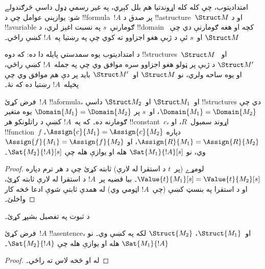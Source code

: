 \documentclass[../../../include/open-logic-section]{subfiles}
\begin{document}


\begin{explain}
امتداديتوب، چې کله کله اړوندتيا هم بلل کېږي، په غير رسمي ډول داسې
څرګندولے شو: يوازېني عوامل چې د !!{formula}~$!A$ پر صدق د
!!a{structure}~$\Struct M$ او د !!a{variable} ګومارنې~$s$ په نسبت
اغېز لري، د !!{domain} کچه او هغه ګومارنې دي چې~$\Struct M$ او~$s$ ئې
د ژبې هغو اجزاوو ته کوي چې په رښتيا په~$!A$ کښې راځي۔

د امتداديتوب يوه سمدستي پايله دا ده: که دوه
!!{structure}s~$\Struct M$ او~$\Struct M'$ د ژبې پر ټولو هغو اجزاوو
سره موافق وي چې په جمله~$!A$ کښې راځي، او يوه ساحه ولري، نو
$\Struct M$ او~$\Struct M'$ بايد پر دې هم موافق وي چې پخپله~$!A$
رښتيا ده که نۀ۔
\end{explain}

\begin{prop}[امتداديتوب]
  فرض کړئ~$!A$ !!a{formula}، او~$\Struct M_1$ او~$\Struct M_2$ داسې
  !!{structure}s دي چې $\Domain{M_1} = \Domain{M_2}$، او~$s$ پر
  $\Domain{M_1} = \Domain{M_2}$ يوه متغير ګومارنه ده۔ که په~$!A$ کښې
  د راتلونکو هر !!{constant}~$c$، اړوند سمبول~$R$، او
  !!{function}~$f$ دپاره
  $\Assign{c}{M_1} = \Assign{c}{M_2}$،
  $\Assign{R}{M_1}=\Assign{R}{M_2}$، او
  $\Assign{f}{M_1} = \Assign{f}{M_2}$ وي، نو
  $\Sat{M_1}{!A}[s]$ هله او يوازې هله چې $\Sat{M_2}{!A}[s]$۔
\end{prop}

\begin{proof}
  لومړے (پر~$t$ د استقرا له لارې) ثابته کړئ چې د هر ترم دپاره
  $\Value{t}{M_1}[s] = \Value{t}{M_2}[s]$۔ بيا قضيه پر~$!A$ د استقرا
  له لارې ثابته کړئ، او د استقرا په بنسټ کښې (چې~$!A$ اټومي وي) له
  همدې ثابتې شوې ادعا څخه کار واخلئ۔
\end{proof}

\begin{prob}
د  ثبوت په تفصيل بشپړ کړئ۔
\end{prob}

\begin{cor}
  فرض کړئ~$!A$ !!a{sentence}، او~$\Struct{M_1}$، $\Struct{M_2}$ لکه
  په  کښې وي۔ نو $\Sat{M_1}{!A}$ هله او
  يوازې هله چې $\Sat{M_2}{!A}$۔
\end{cor}

\begin{proof}
له  او  څخه
لاس ته راځي۔
\end{proof}
\end{document}
